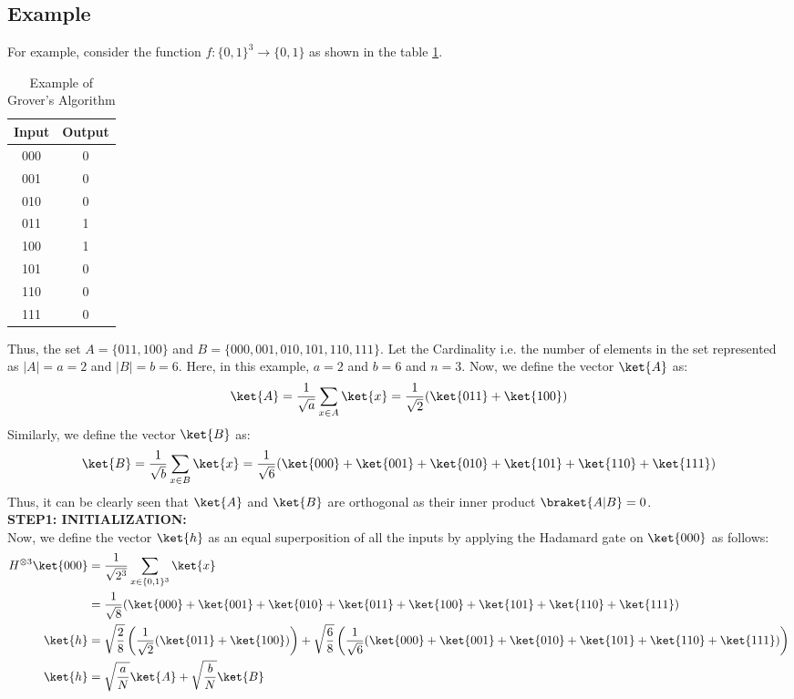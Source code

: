 \documentclass[12pt, oneside]{book}
\theoremstyle{definition}
\theoremstyle{definition}
\theoremstyle{remark}
\begin{document}
\subsection{Example}
For example, consider the function $f:\{0,1\}^3 \rightarrow \{0,1\}$ as shown in the table \ref{tab:groverex1}.
\begin{table}[H]
    \centering
    \begin{tabular}{|c|c|}
        \hline
        Input & Output \\
        \hline
        000 & 0 \\
        001 & 0 \\
        010 & 0 \\
        011 & 1 \\
        100 & 1 \\
        101 & 0 \\
        110 & 0 \\
        111 & 0 \\
        \hline
    \end{tabular}
    \caption{Example of Grover's Algorithm}
    \label{tab:groverex1}   
\end{table}
Thus, the set $A=\{011,100\}$ and $B=\{000,001,010,101,110,111\}$. Let the Cardinality i.e. the number of elements in the set represented as $|A|=a=2$ and $|B|=b=6$.
Here, in this example, $a=2$ and $b=6$ and $n=3$. Now, we define the vector $\ket{A}$ as:
\[
    \ket{A}=\frac{1}{\sqrt{a}}\sum_{x \in A}\ket{x}=\frac{1}{\sqrt{2}}(\ket{011}+\ket{100})
\]
Similarly, we define the vector $\ket{B}$ as:
\[
    \ket{B}=\frac{1}{\sqrt{b}}\sum_{x \in B}\ket{x}=\frac{1}{\sqrt{6}}(\ket{000}+\ket{001}+\ket{010}+\ket{101}+\ket{110}+\ket{111})
\]
Thus, it can be clearly seen that $\ket{A}$ and $\ket{B}$ are orthogonal as their inner product $\braket{A|B}=0$.\\
\textbf{STEP1: INITIALIZATION: }\\
Now, we define the vector $\ket{h}$ as an equal superposition of all the inputs by applying the Hadamard gate on  $\ket{000}$ as follows:
\begin{align*}
    H^{\otimes 3}\ket{000}&=\frac{1}{\sqrt{2^3}}\sum_{x \in \{0,1\}^3}\ket{x}\\
    &=\frac{1}{\sqrt{8}}(\ket{000}+\ket{001}+\ket{010}+\ket{011}+\ket{100}+\ket{101}+\ket{110}+\ket{111})\\
    \ket{h}&=\sqrt{\frac{2}{8}}\left(\frac{1}{\sqrt{2}}(\ket{011}+\ket{100})\right)+\sqrt{\frac{6}{8}}\left(\frac{1}{\sqrt{6}}(\ket{000}+\ket{001}+\ket{010}+\ket{101}+\ket{110}+\ket{111})\right)\\
    \ket{h}&=\sqrt{\frac{a}{N}}\ket{A}+\sqrt{\frac{b}{N}}\ket{B}
\end{align*}
\end{document}
